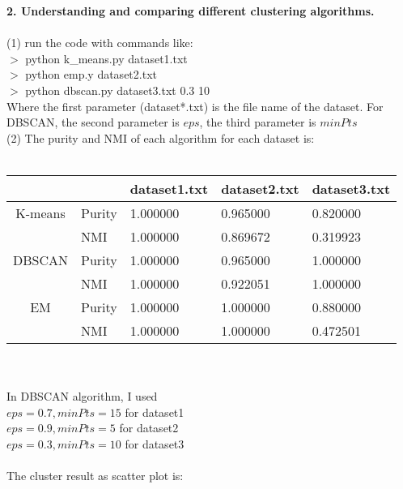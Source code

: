 \documentclass[11pt,a4paper,fleqn]{article}
\begin{document}
\textbf{2. Understanding and comparing different clustering algorithms.}\\ \\
(1) run the code with commands like:\\
$>$ python k\_means.py dataset1.txt\\
$>$ python emp.y dataset2.txt\\
$>$ python dbscan.py dataset3.txt 0.3 10\\
Where the first parameter (dataset*.txt) is the file name of the dataset. For DBSCAN, the second parameter is $eps$, the third parameter is $minPts$\\
(2) The purity and NMI of each algorithm for each dataset is:\\ \\
\begin{tabular}{|c|l|l|l|l|}
\hline
&&dataset1.txt&dataset2.txt&dataset3.txt\\
\hline
K-means&Purity&1.000000&0.965000&0.820000\\
 &NMI&1.000000&0.869672&0.319923\\
\hline
DBSCAN&Purity&1.000000&0.965000&1.000000\\
 &NMI&1.000000&0.922051&1.000000\\
\hline
EM&Purity&1.000000&1.000000&0.880000\\
 &NMI&1.000000&1.000000&0.472501\\
\hline
\end{tabular}\\ \\
In DBSCAN algorithm, I used\\
$eps = 0.7, minPts = 15$ for dataset1\\
$eps = 0.9, minPts = 5$ for dataset2\\
$eps = 0.3, minPts = 10$ for dataset3\\ \\
The cluster result as scatter plot is:\\
\end{document}
